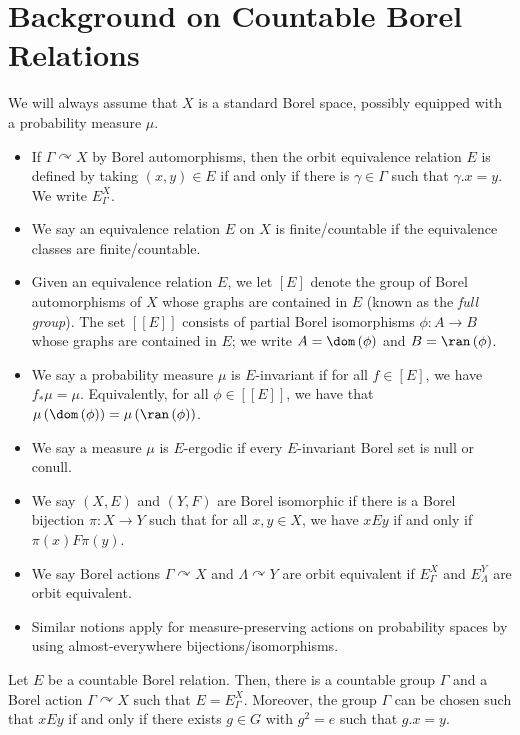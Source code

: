 \documentclass[10pt]{mypackage}
\begin{document}
\RaggedRight
\section{Background on Countable Borel Relations}%
We will always assume that $X$ is a standard Borel space, possibly equipped with a probability measure $\mu$.
\begin{definition}\hfill
  \begin{itemize}
    \item If $\Gamma\curvearrowright X$ by Borel automorphisms, then the orbit equivalence relation $E$ is defined by taking $\left( x,y \right)\in E$ if and only if there is $\gamma\in \Gamma$ such that $\gamma.x = y$. We write $E_{\Gamma}^{X}$.
    \item We say an equivalence relation $E$ on $X$ is finite/countable if the equivalence classes are finite/countable.
    \item Given an equivalence relation $E$, we let $\left[ E \right]$ denote the group of Borel automorphisms of $X$ whose graphs are contained in $E$ (known as the \textit{full group}). The set $\left[ \left[ E \right] \right]$ consists of partial Borel isomorphisms $\phi\colon A\to B$ whose graphs are contained in $E$; we write $A = \dom\left( \phi \right)$ and $B = \ran\left( \phi \right)$.
    \item We say a probability measure $\mu$ is $E$-invariant if for all $f\in [E]$, we have $f_{\ast}\mu = \mu$. Equivalently, for all $\phi\in \left[ \left[ E \right] \right]$, we have that $\mu\left( \dom\left( \phi \right) \right) = \mu\left( \ran\left( \phi \right) \right)$.
    \item We say a measure $\mu$ is $E$-ergodic if every $E$-invariant Borel set is null or conull.
    \item We say $\left( X,E \right)$ and $\left( Y,F \right)$ are Borel isomorphic if there is a Borel bijection $\pi\colon X\to Y$ such that for all $x,y\in X$, we have $xEy$ if and only if $\pi(x)F\pi(y)$.
    \item We say Borel actions $\Gamma\curvearrowright X$ and $\Lambda\curvearrowright Y$ are orbit equivalent if $E_{\Gamma}^X$ and $E_{\Lambda}^Y$ are orbit equivalent.
    \item Similar notions apply for measure-preserving actions on probability spaces by using almost-everywhere bijections/isomorphisms.
  \end{itemize}
\end{definition}
\begin{theorem}
  Let $E$ be a countable Borel relation. Then, there is a countable group $\Gamma$ and a Borel action $\Gamma\curvearrowright X$ such that $E = E_{\Gamma}^X$. Moreover, the group $\Gamma$ can be chosen such that $xEy$ if and only if there exists $g\in G$ with $g^2 = e$ such that $g.x = y$.
\end{theorem}
\end{document}
